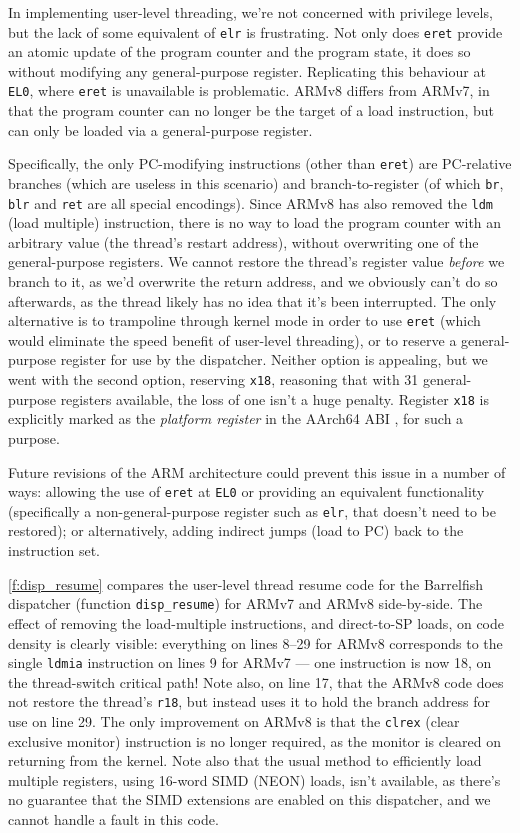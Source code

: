 \documentclass[a4paper,twoside]{report}
\begin{document}
In implementing user-level threading, we're not concerned with privilege
levels, but the lack of some equivalent of \texttt{elr} is frustrating. Not
only does \texttt{eret} provide an atomic update of the program counter and
the program state, it does so without modifying any general-purpose register.
Replicating this behaviour at \texttt{EL0}, where \texttt{eret} is unavailable
is problematic. ARMv8 differs from ARMv7, in that the program counter can no
longer be the target of a load instruction, but can only be loaded via a
general-purpose register.

Specifically, the only PC-modifying instructions (other than \texttt{eret})
are PC-relative branches (which are useless in this scenario) and
branch-to-register (of which \texttt{br}, \texttt{blr} and \texttt{ret} are
all special encodings). Since ARMv8 has also removed the \texttt{ldm} (load
multiple) instruction, there is no way to load the program counter with an
arbitrary value (the thread's restart address), without overwriting one of the
general-purpose registers. We cannot restore the thread's register value
\emph{before} we branch to it, as we'd overwrite the return address, and we
obviously can't do so afterwards, as the thread likely has no idea that it's
been interrupted. The only alternative is to trampoline through kernel mode in
order to use \texttt{eret} (which would eliminate the speed benefit of
user-level threading), or to reserve a general-purpose register for use by the
dispatcher. Neither option is appealing, but we went with the second option,
reserving \texttt{x18}, reasoning that with 31 general-purpose registers
available, the loss of one isn't a huge penalty. Register \texttt{x18} is
explicitly marked as the \emph{platform register} in the AArch64 ABI
\citep{arm:aa64pcs}, for such a purpose.

Future revisions of the ARM architecture could prevent this issue in a number
of ways: allowing the use of \texttt{eret} at \texttt{EL0} or providing an
equivalent functionality (specifically a non-general-purpose register such as
\texttt{elr}, that doesn't need to be restored); or alternatively, adding
indirect jumps (load to PC) back to the instruction set.

\autoref{f:disp_resume} compares the user-level thread resume code for the
Barrelfish dispatcher (function \texttt{disp\_resume}) for ARMv7 and ARMv8
side-by-side. The effect of removing the load-multiple instructions, and
direct-to-SP loads, on code density is clearly visible: everything on lines
8--29 for ARMv8 corresponds to the single \texttt{ldmia} instruction on lines
9 for ARMv7 --- one instruction is now 18, on the thread-switch critical path!
Note also, on line 17, that the ARMv8 code does not restore the thread's
\texttt{r18}, but instead uses it to hold the branch address for use on line
29. The only improvement on ARMv8 is that the \texttt{clrex} (clear exclusive
monitor) instruction is no longer required, as the monitor is cleared on
returning from the kernel. Note also that the usual method to efficiently load
multiple registers, using 16-word SIMD (NEON) loads, isn't available, as
there's no guarantee that the SIMD extensions are enabled on this dispatcher,
and we cannot handle a fault in this code.
\end{document}
